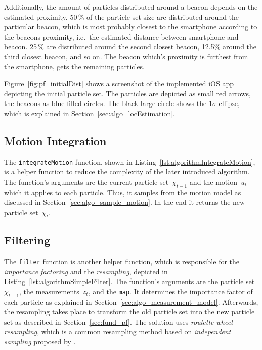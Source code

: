 Additionally, the amount of particles distributed around a beacon depends on the estimated proximity. 50\,\% of the particle set size are distributed around the particular beacon, which is most probably closest to the smartphone according to the beacons proximity, i.e.\ the estimated distance between smartphone and beacon. 25\,\% are distributed around the second closest beacon, 12.5\% around the third closest beacon, and so on. The beacon which's proximity is furthest from the smartphone, gets the remaining particles.

Figure~\ref{fig:pf_initialDist} shows a screenshot of the implemented iOS app depicting the initial particle set. The particles are depicted as small red arrows, the beacons as blue filled circles. The black large circle shows the $1\sigma\text{-ellipse}$, which is explained in Section~\ref{sec:algo_locEstimation}.


\subsection{Motion Integration}
The \texttt{integrateMotion} function, shown in Listing~\ref{lst:algorithmIntegrateMotion}, is a helper function to reduce the complexity of the later introduced algorithm. The function's arguments are the current particle set~$\chi_{t-1}$ and the motion~$u_t$ which it applies to each particle. Thus, it samples from the motion model as discussed in Section~\ref{sec:algo_sample_motion}. In the end it returns the new particle set~$\chi_t$.




\subsection{Filtering}
The \texttt{filter} function is another helper function, which is responsible for the \emph{importance factoring} and the \emph{resampling}, depicted in Listing~\ref{lst:algorithmSimpleFilter}. The function's arguments are the particle set~$\chi_{t-1}$, the measurements~$z_t$, and the \texttt{map}. It determines the importance factor of each particle as explained in Section~\ref{sec:algo_measurement_model}. Afterwards, the resampling takes place to transform the old particle set into the new particle set as described in Section~\ref{sec:fund_pf}. The solution uses \emph{roulette wheel resampling}, which is a common resampling method based on \emph{independent sampling} proposed by \citet[p. 108--111]{thrun:prob_robo}.

